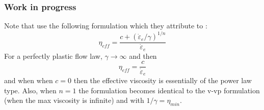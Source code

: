 \subsubsection{Work in progress}

\Literature \cite{zico74,zigo74,zico74b,zien75,corm75,zigo75,zihl75,zijo78,vidm82,vidm84,vede84,zivt85,vimd86}
\cite{wasd97,debo88,debo01,hesd02,bewv11,mumg10,leor89,sccm13,desm93,demu92,debo91,shmv16}
\cite{modm01}\cite{baji02}
\cite{modm02}

Note that \cite{vidm82,vidm84,vimd86,zivt85} use the following formulation which they attribute to \cite{zijo78}:
\[
\eta_{eff} = \frac{c + (\dot{\varepsilon}_e / \gamma)^{1/n}}{ \dot{\varepsilon}_e }
\] 
For a perfectly plastic flow law, $\gamma \rightarrow \infty$ and then 
\[
\eta_{eff} = \frac{c}{ \dot{\varepsilon}_e }
\] 
and when when $c=0$ then the effective viscosity is essentially of the power law type.
Also, when $n=1$ the formulation becomes identical to the v-vp formulation (when the max viscosity is infinite) and with $1/\gamma=\eta_{min}$.





